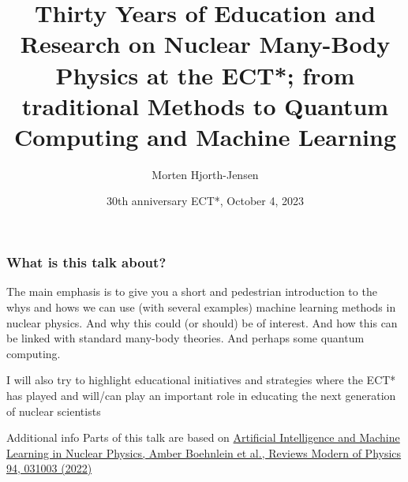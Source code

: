 \documentclass{beamer}
\begin{document}

\newcommand{\exercisesection}[1]{\subsection*{#1}}







\title{Thirty Years of Education and Research on Nuclear Many-Body Physics at the ECT*; from traditional Methods to Quantum Computing and Machine Learning}


\author{Morten Hjorth-Jensen}

\date{30th anniversary ECT*, October 4, 2023
}

\begin{frame}
\titlepage
\end{frame}

\begin{frame}
\frametitle{What is this talk about?}

\begin{block}{}
The main emphasis is to give you a short and pedestrian introduction to the whys and hows we can use (with several examples) machine learning methods
in nuclear physics. And why this could (or should) be of interest. And how this can be linked with standard many-body theories. And perhaps some quantum computing.
\end{block}

\begin{block}{}
I will also try to highlight educational initiatives and strategies where the ECT* has played and will/can play an important role in educating the next generation of nuclear scientists
\end{block}

\begin{block}{Additional info }
Parts of this talk are based on \href{{https://journals.aps.org/rmp/abstract/10.1103/RevModPhys.94.031003}}{Artificial Intelligence and Machine Learning in Nuclear Physics, Amber Boehnlein et al., Reviews Modern of Physics 94, 031003 (2022)} 

\end{block}
\end{frame}
\end{document}
